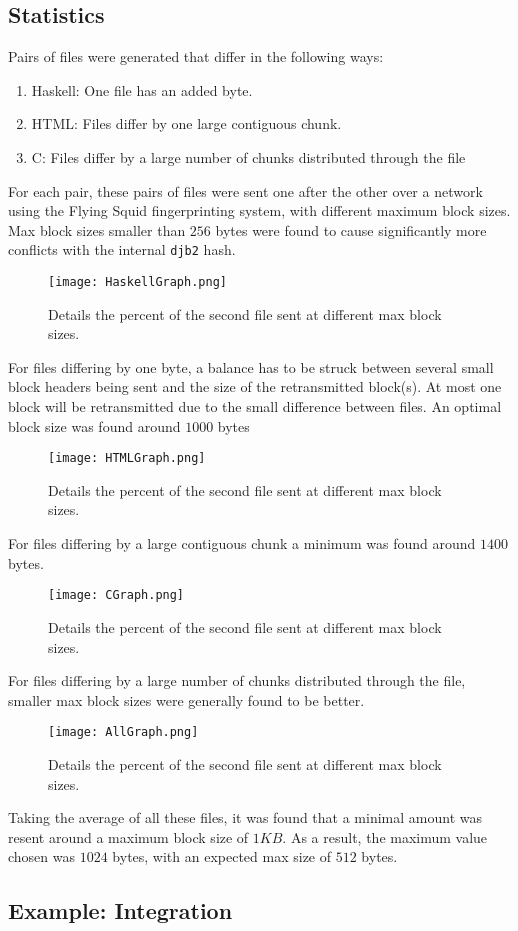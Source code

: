 \subsection {Statistics}

Pairs of files were generated that differ in the following ways:

\begin{enumerate}
\item Haskell: One file has an added byte.
\item HTML: Files differ by one large contiguous chunk.
\item C: Files differ by a large number of chunks distributed through the file
\end{enumerate}

For each pair, these pairs of files were sent one after the other over a network using the Flying Squid fingerprinting system, with different maximum block sizes. Max block sizes 	smaller than $256$ bytes were found to cause significantly more conflicts with the internal \verb|djb2| hash. 


\begin{figure}[H] \centering
\texttt{[image: HaskellGraph.png]}
\caption{Details the percent of the second file sent at different max block sizes.}
\end{figure}
\noindent
For files differing by one byte, a balance has to be struck between several small block headers being sent and the size of the retransmitted block(s). At most one block will be retransmitted due to the small difference between files. An optimal block size was found around $1000$ bytes

\begin{figure}[H] \centering
\texttt{[image: HTMLGraph.png]}
\caption{Details the percent of the second file sent at different max block sizes.}
\end{figure}
\noindent
For files differing by a large contiguous chunk a minimum was found around $1400$ bytes.

\begin{figure}[H] \centering
\texttt{[image: CGraph.png]}
\caption{Details the percent of the second file sent at different max block sizes.}
\end{figure}
\noindent
For files differing by a large number of chunks distributed through the file, smaller max block sizes were generally found to be better.


\begin{figure}[H] \centering
\texttt{[image: AllGraph.png]}
\caption{Details the percent of the second file sent at different max block sizes.}
\end{figure}
\noindent
Taking the average of all these files, it was found that a minimal amount was resent around a maximum block size of $1 KB$. As a result, the maximum value chosen was $1024$ bytes, with an expected max size of $512$ bytes.

\subsection{Example: Integration}


